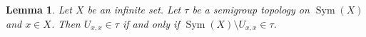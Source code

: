 \documentclass[11pt]{amsart}
\newcommand*\pct{\scalebox{.8}{\%}}
\newtheorem{lemma}[theorem]{Lemma}
\theoremstyle{definition}
\newcommand{\N}{\mathbb N}
\newcommand{\Sym}{\operatorname{Sym}}
\begin{document}
\begin{lemma}\label{open iff closed}
Let \(X\) be an infinite set. Let \(\tau\) be a semigroup topology on \(\Sym(X)\) and \(x\in X\). Then 
 \(U_{x,x}\in\tau\) if and only if \(\Sym(X)\setminus U_{x,x}\in\tau\).
\end{lemma}
\end{document}
